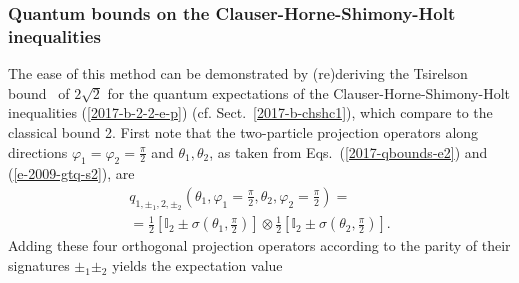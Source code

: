 \subsubsection{Quantum bounds on the Clauser-Horne-Shimony-Holt inequalities}

The ease of this method can be demonstrated by (re)deriving the Tsirelson bound~\cite{cirelson:80}
of $2\sqrt{2}$ for the quantum expectations of the Clauser-Horne-Shimony-Holt inequalities (\ref{2017-b-2-2-e-p})
(cf. Sect.~\ref{2017-b-chshc1}), which compare to the classical bound 2.
First note that the two-particle projection operators along directions $\varphi_1=\varphi_2=\frac{\pi}{2}$
and $\theta_1, \theta_2$, as taken  from Eqs.~(\ref{2017-qbounds-e2}) and (\ref{e-2009-gtq-s2}), are
\begin{equation}
\begin{split}
q_{1, \pm_1 ,2, \pm_2 }( \theta_1,\varphi_1  = \frac{\pi}{2} , \theta_2,\varphi_2=\frac{\pi}{2})
 =   \\ =
 {\frac{1}{2}}\left[{\mathbb I}_2 \pm {\sigma}( \theta_1,\frac{\pi}{2} )\right]
 \otimes
 {\frac{1}{2}}\left[{\mathbb I}_2 \pm {\sigma}( \theta_2,\frac{\pi}{2} )\right]
.
\end{split}
\label{e-2017-b-whatever-e1}
\end{equation}
Adding these four orthogonal projection operators according to the parity of their signatures $\pm_1  \pm_2$
yields the expectation value

